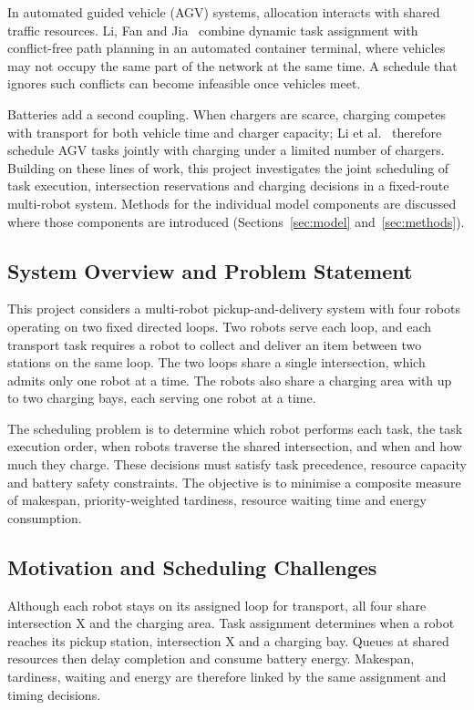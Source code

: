 \documentclass[11pt,a4paper]{article}
\begin{document}
In automated guided vehicle (AGV) systems, allocation interacts with shared traffic resources.
Li, Fan and Jia~\cite{li2024conflict} combine dynamic task assignment with conflict-free path planning
in an automated container terminal, where vehicles may not occupy the same part of the network at the
same time. A schedule that ignores such conflicts can become infeasible once vehicles meet.

Batteries add a second coupling. When chargers are scarce, charging competes with transport for both
vehicle time and charger capacity; Li et al.~\cite{li2025chargers} therefore schedule AGV tasks
jointly with charging under a limited number of chargers. Building on these lines of work, this
project investigates the joint scheduling of task execution, intersection reservations and charging
decisions in a fixed-route multi-robot system. Methods for the individual model components are
discussed where those components are introduced (Sections~\ref{sec:model} and~\ref{sec:methods}).

\subsection{System Overview and Problem Statement}

This project considers a multi-robot pickup-and-delivery system with four robots operating
on two fixed directed loops. Two robots serve each loop, and each transport task requires a
robot to collect and deliver an item between two stations on the same loop. The two loops share a
single intersection, which admits only one robot at a time. The robots also share a charging
area with up to two charging bays, each serving one robot at a time.

The scheduling problem is to determine which robot performs each task, the task execution order,
when robots traverse the shared intersection, and when and how much they charge. These
decisions must satisfy task precedence, resource capacity and battery safety constraints. The objective
is to minimise a composite measure of makespan, priority-weighted tardiness, resource waiting time and
energy consumption.

\subsection{Motivation and Scheduling Challenges}

Although each robot stays on its assigned loop for transport, all four share intersection X and the
charging area. Task assignment determines when a robot reaches its pickup station, intersection X and a
charging bay. Queues at shared resources then delay completion and consume battery energy. Makespan,
tardiness, waiting and energy are therefore linked by the same assignment and timing decisions.
\end{document}
